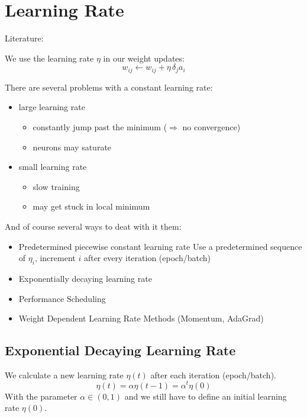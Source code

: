 \section{Learning Rate}\label{sec:learning-rate}
Literature: \cite[Chapter 6.8]{Duda2000}

We use the learning rate $\eta$ in our weight updates: $$w_{ij} \leftarrow w_{ij} + \eta\, \delta_j a_i$$

There are several problems with a constant learning rate:
\begin{itemize}
\item large learning rate
	\begin{itemize}
	\item constantly jump past the minimum ($\Rightarrow$ no convergence)
	\item neurons may saturate
	\end{itemize}
\item small learning rate
	\begin{itemize}
	\item slow training
	\item may get stuck in local minimum
	\end{itemize}
\end{itemize}

And of course several ways to deat with it them:
\begin{itemize}
\item Predetermined piecewise constant learning rate\newline
	Use a predetermined sequence of $\eta_i$, increment $i$ after every iteration (epoch/batch)
\item Exponentially decaying learning rate
\item Performance Scheduling
\item Weight Dependent Learning Rate Methods (\eg Momentum, AdaGrad)
\end{itemize}

\subsection{Exponential Decaying Learning Rate}
We calculate a new learning rate $\eta(t)$ after each iteration (epoch/batch).
\begin{equation}\label{eq:exponential-decaying-eta}
\eta(t)=\alpha\eta(t-1)=\alpha^t\eta(0)
\end{equation}
With the parameter $\alpha \in (0,1)$ and we still have to define an initial learning rate $\eta(0)$.

